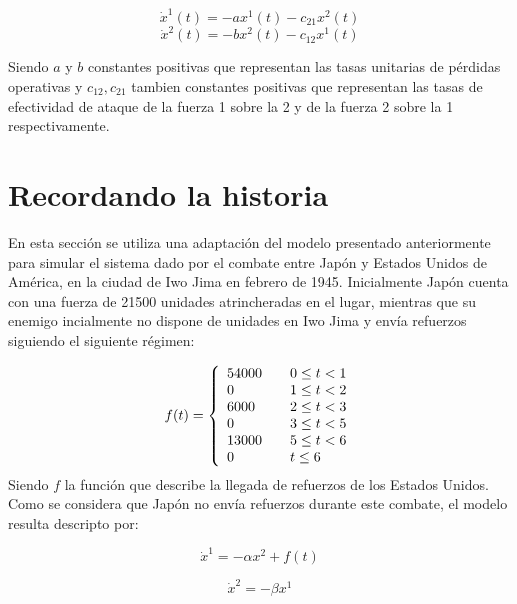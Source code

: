\documentclass[a4paper,10pt]{article}
\begin{document}
\begin{equation}
\dot{x}^1(t) = -ax^1(t) - c_{21} x^2(t)\end{equation}
\begin{equation}
\dot{x}^2(t) = -bx^2(t) - c_{12} x^1(t)\end{equation}

Siendo $a$ y $b$ constantes positivas que representan las tasas unitarias de pérdidas operativas y $c_{12}, c_{21}$ tambien constantes positivas
que representan las tasas de efectividad de ataque de la fuerza 1 sobre la 2 y de la fuerza 2 sobre la 1 respectivamente.

\section{Recordando la historia}

En esta sección se utiliza una adaptación del modelo presentado anteriormente para simular el sistema dado por el combate entre Japón y 
Estados Unidos de América, en la ciudad de Iwo Jima en febrero de 1945. Inicialmente Japón cuenta con una fuerza de 21500 unidades 
atrincheradas en el lugar, mientras que su enemigo incialmente no dispone de unidades en Iwo Jima y envía refuerzos siguiendo el siguiente 
régimen:

\begin{equation}
f(t) = \left\{ 
    \begin{array}{l l}
    54000 & \quad 0 \leq t < 1 \\
    0 & \quad 1 \leq t < 2\\
    6000 & \quad 2 \leq t < 3\\
    0 & \quad 3 \leq t < 5\\
    13000 & \quad 5 \leq t < 6\\
    0 & \quad t \leq 6\\
    \end{array} \right.
\end{equation}
Siendo $f$ la función que describe la llegada de refuerzos de los Estados Unidos. Como se considera que Japón no envía refuerzos durante este
combate, el modelo resulta descripto por:

\begin{equation}
 \dot{x}^1 = -\alpha x^2 + f(t)
\end{equation}

\begin{equation}
\dot{x}^2 = -\beta x^1
\end{equation}
\end{document}
